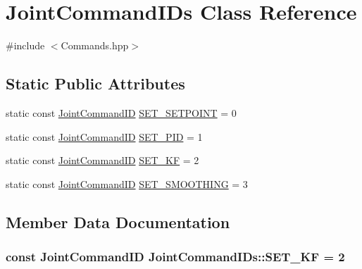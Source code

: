 \hypertarget{classJointCommandIDs}{}\section{Joint\+Command\+I\+Ds Class Reference}
\label{classJointCommandIDs}


{\ttfamily \#include $<$Commands.\+hpp$>$}

\subsection*{Static Public Attributes}
\begin{DoxyCompactItemize}
\item 
static const \hyperlink{Commands_8hpp_a350356b969551ce1a95947b3cec75d56}{Joint\+Command\+ID} \hyperlink{classJointCommandIDs_ab6cee2ae7d4cde9db2b016229c163629}{S\+E\+T\+\_\+\+S\+E\+T\+P\+O\+I\+NT} = 0
\item 
static const \hyperlink{Commands_8hpp_a350356b969551ce1a95947b3cec75d56}{Joint\+Command\+ID} \hyperlink{classJointCommandIDs_a4aaed21f38109293163281c9eff64c78}{S\+E\+T\+\_\+\+P\+ID} = 1
\item 
static const \hyperlink{Commands_8hpp_a350356b969551ce1a95947b3cec75d56}{Joint\+Command\+ID} \hyperlink{classJointCommandIDs_a10050eb6afeb05106e3850b2728cec7f}{S\+E\+T\+\_\+\+KF} = 2
\item 
static const \hyperlink{Commands_8hpp_a350356b969551ce1a95947b3cec75d56}{Joint\+Command\+ID} \hyperlink{classJointCommandIDs_a725ccc7643d16d449814be53cd1f8cd8}{S\+E\+T\+\_\+\+S\+M\+O\+O\+T\+H\+I\+NG} = 3
\end{DoxyCompactItemize}


\subsection{Member Data Documentation}
\subsubsection[{\texorpdfstring{S\+E\+T\+\_\+\+KF}{SET_KF}}]{\setlength{\rightskip}{0pt plus 5cm}const {\bf Joint\+Command\+ID} Joint\+Command\+I\+Ds\+::\+S\+E\+T\+\_\+\+KF = 2\hspace{0.3cm}{\ttfamily [static]}}\hypertarget{classJointCommandIDs_a10050eb6afeb05106e3850b2728cec7f}{}\label{classJointCommandIDs_a10050eb6afeb05106e3850b2728cec7f}
